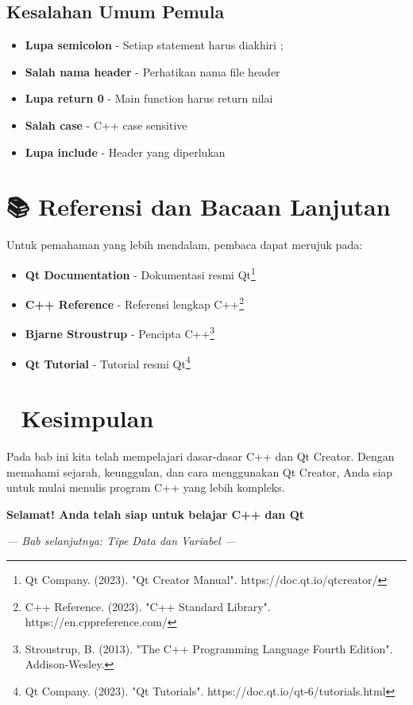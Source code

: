 \subsection{Kesalahan Umum Pemula}

\begin{itemize}
\item \textbf{Lupa semicolon} - Setiap statement harus diakhiri ;
\item \textbf{Salah nama header} - Perhatikan nama file header
\item \textbf{Lupa return 0} - Main function harus return nilai
\item \textbf{Salah case} - C++ case sensitive
\item \textbf{Lupa include} - Header yang diperlukan
\end{itemize}

\section{📚 Referensi dan Bacaan Lanjutan}

Untuk pemahaman yang lebih mendalam, pembaca dapat merujuk pada:

\begin{itemize}
\item \textbf{Qt Documentation} - Dokumentasi resmi Qt\footnote{Qt Company. (2023). "Qt Creator Manual". https://doc.qt.io/qtcreator/}
\item \textbf{C++ Reference} - Referensi lengkap C++\footnote{C++ Reference. (2023). "C++ Standard Library". https://en.cppreference.com/}
\item \textbf{Bjarne Stroustrup} - Pencipta C++\footnote{Stroustrup, B. (2013). "The C++ Programming Language Fourth Edition". Addison-Wesley.}
\item \textbf{Qt Tutorial} - Tutorial resmi Qt\footnote{Qt Company. (2023). "Qt Tutorials". https://doc.qt.io/qt-6/tutorials.html}
\end{itemize}

\section{🎉 Kesimpulan}

Pada bab ini kita telah mempelajari dasar-dasar C++ dan Qt Creator. Dengan memahami sejarah, keunggulan, dan cara menggunakan Qt Creator, Anda siap untuk mulai menulis program C++ yang lebih kompleks.

\begin{center}
\textbf{Selamat! Anda telah siap untuk belajar C++ dan Qt} 🚀
\end{center}

\vspace{1cm}

\begin{center}
\textit{--- Bab selanjutnya: Tipe Data dan Variabel ---}
\end{center}
